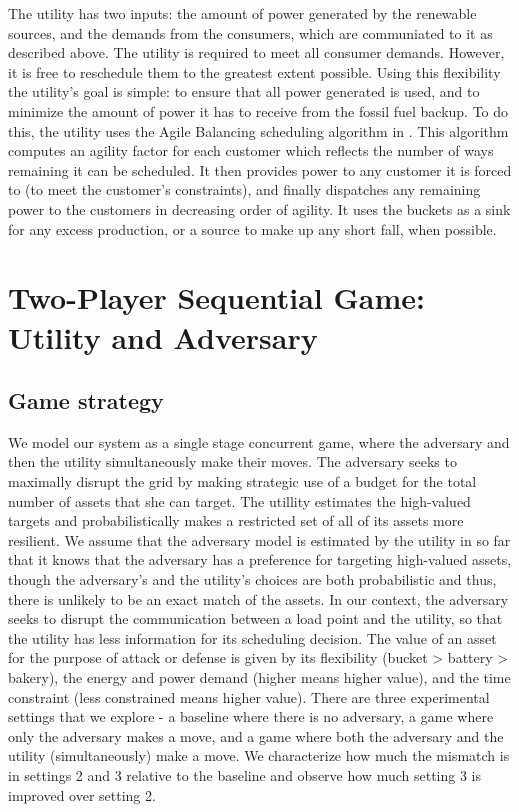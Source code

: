 \documentclass[conference]{IEEEtran}
\begin{document}
The utility has two inputs: the amount of power generated by the renewable sources, and the demands from the consumers, which are communiated to it as described above. The utility is required to meet all consumer demands. However, it is free to reschedule them to the greatest extent possible. Using this flexibility the utility's goal is simple: to ensure that all power generated is used, and to minimize the amount of power it has to receive from the fossil fuel backup. To do this, the utility uses the Agile Balancing scheduling algorithm in \cite{petersen2013taxonomy}. This algorithm computes an agility factor for each customer which reflects the number of ways remaining it can be scheduled.  It then provides power to any customer it is forced to (to meet the customer's constraints), and finally dispatches any remaining power to the customers in decreasing order of agility.  It uses the buckets as a sink for any excess production, or a source to make up any short fall, when possible.

\section{Two-Player Sequential Game: Utility and Adversary}
\label{Game}

\subsection{Game strategy}

We model our system as a single stage concurrent game, where the adversary and then the utility simultaneously make their moves. The adversary seeks to maximally disrupt the grid by making strategic use of a budget for the total number of assets that she can target. The utillity estimates the high-valued targets and probabilistically makes a restricted set of all of its assets more resilient. We assume that the adversary model is estimated by the utility in so far that it knows that the adversary has a preference for targeting high-valued assets, though the adversary's and the utility's choices are both probabilistic and thus, there is unlikely to be an exact match of the assets. In our context, the adversary seeks to disrupt the communication between a load point and the utility, so that the utility has less information for its scheduling decision. The value of an asset for the purpose of attack or defense is given by its flexibility (bucket > battery > bakery), the energy and power demand (higher means higher value), and the time constraint (less constrained means higher value).  
There are three experimental settings that we explore - a baseline where there is no adversary, a game where only the adversary makes a move, and a game where both the adversary and the utility (simultaneously) make a move. We characterize how much the mismatch is in settings 2 and 3 relative to the baseline and observe how much setting 3 is improved over setting 2. 
\end{document}
